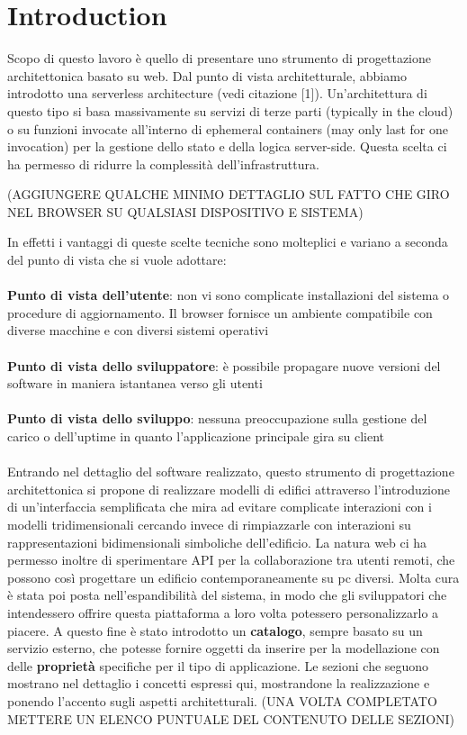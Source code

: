 \section{Introduction}

Scopo di questo lavoro è quello di presentare uno strumento di progettazione architettonica basato su web. Dal punto di vista architetturale, abbiamo introdotto una serverless architecture (vedi citazione [1]). Un’architettura di questo tipo si basa massivamente su servizi di terze parti (typically in the cloud) o su funzioni invocate all’interno di ephemeral containers (may only last for one invocation) per la gestione dello stato e della logica server-side. Questa scelta ci ha permesso di ridurre la complessità dell’infrastruttura.




(AGGIUNGERE QUALCHE MINIMO DETTAGLIO SUL FATTO CHE GIRO NEL BROWSER SU QUALSIASI DISPOSITIVO E SISTEMA)


In effetti i vantaggi di queste scelte tecniche sono molteplici e variano a seconda del punto di vista che si vuole adottare:
\\\\
\textbf{Punto di vista dell'utente}: non vi sono complicate installazioni del sistema o procedure di aggiornamento. Il browser fornisce un ambiente compatibile con diverse macchine e con diversi sistemi operativi\\
\\
\textbf{Punto di vista dello sviluppatore}: è possibile propagare nuove versioni del software in maniera istantanea verso gli utenti\\
\\
\textbf{Punto di vista dello sviluppo}: nessuna preoccupazione sulla gestione del carico o dell’uptime in quanto l’applicazione principale gira su client\\\\
Entrando nel dettaglio del software realizzato, questo strumento di progettazione architettonica si propone di realizzare modelli di edifici attraverso l’introduzione di un’interfaccia semplificata che mira ad evitare complicate interazioni con i modelli tridimensionali cercando invece di rimpiazzarle con interazioni su rappresentazioni bidimensionali simboliche dell’edificio.
La natura web ci ha permesso inoltre di sperimentare API per la collaborazione tra utenti remoti, che possono così progettare un edificio contemporaneamente su pc diversi.
Molta cura è stata poi posta nell’espandibilità del sistema, in modo che gli sviluppatori che intendessero offrire questa piattaforma a loro volta potessero personalizzarlo a piacere. A questo fine è stato introdotto un \textbf{catalogo}, sempre basato su un servizio esterno, che potesse fornire oggetti da inserire per la modellazione con delle \textbf{proprietà} specifiche per il tipo di applicazione.
Le sezioni che seguono mostrano nel dettaglio i concetti espressi qui, mostrandone la realizzazione e ponendo l’accento sugli aspetti architetturali. (UNA VOLTA COMPLETATO METTERE UN ELENCO PUNTUALE DEL CONTENUTO DELLE SEZIONI)

